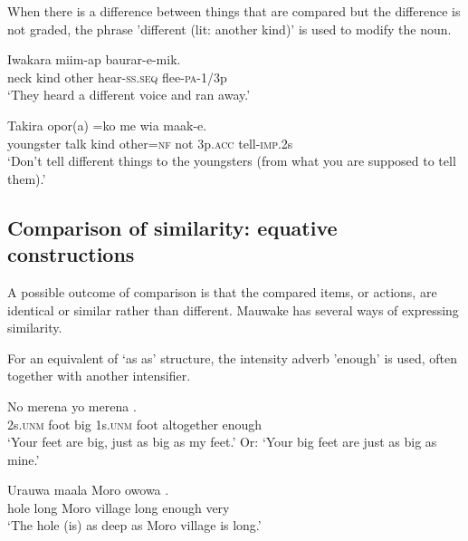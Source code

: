 When there is a difference between things that are compared but the difference is not graded, the phrase  'different (lit: another kind)' is used to modify the noun.

\ea%
\label{ex:x1334}
\gll Iwakara     miim-ap  baurar-e-mik. \\
neck  kind  other  hear-\textsc{ss}.\textsc{seq}  flee-\textsc{pa}-1/3p\\
\glt `They heard a different voice and ran away.'
\z

\ea%
\label{ex:x1335}
\gll Takira  opor(a)    =ko  me  wia  maak-e. \\
youngster  talk  kind  other=\textsc{nf}  not  3p.\textsc{acc}  tell-\textsc{imp}.2s\\
\glt `Don't tell different things to the youngsters (from what you are supposed to tell them).'
\z

\subsection{Comparison of similarity: equative constructions}\footnotemark{}
{}
A possible outcome of comparison is that the compared items, or actions, are identical or similar rather than different. Mauwake has several ways of expressing similarity. 

For an equivalent of  `as  as' structure, the intensity adverb  'enough' is used, often together with another intensifier.

\ea%
\label{ex:x1331}
\gll No  merena    yo  merena    . \\
2s.\textsc{unm}  foot  big  1s.\textsc{unm}  foot  altogether  enough\\
\glt `Your feet are big, just as big as my feet.' Or: `Your big feet are just as big as mine.'
\z

\ea%
\label{ex:x1332}
\gll Urauwa  maala  Moro  owowa      . \\
hole  long  Moro  village  long  enough  very\\
\glt `The hole (is) as deep as Moro village is long.'
\z

